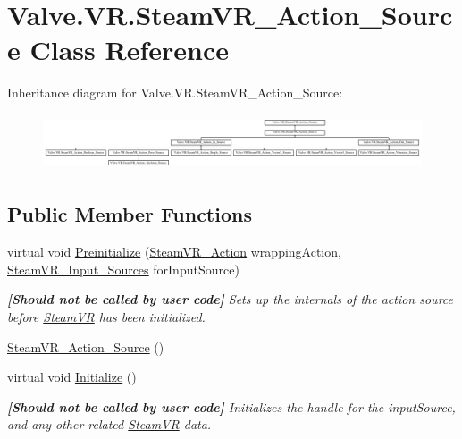 \hypertarget{class_valve_1_1_v_r_1_1_steam_v_r___action___source}{}\section{Valve.\+V\+R.\+Steam\+V\+R\+\_\+\+Action\+\_\+\+Source Class Reference}
\label{class_valve_1_1_v_r_1_1_steam_v_r___action___source}
Inheritance diagram for Valve.\+V\+R.\+Steam\+V\+R\+\_\+\+Action\+\_\+\+Source\+:\begin{figure}[H]
\begin{center}
\leavevmode
\includegraphics[height=1.678657cm]{class_valve_1_1_v_r_1_1_steam_v_r___action___source}
\end{center}
\end{figure}
\subsection*{Public Member Functions}
\begin{DoxyCompactItemize}
\item 
virtual void \mbox{\hyperlink{class_valve_1_1_v_r_1_1_steam_v_r___action___source_aa2bec7f32b37595de01f1456a3fa5bfe}{Preinitialize}} (\mbox{\hyperlink{class_valve_1_1_v_r_1_1_steam_v_r___action}{Steam\+V\+R\+\_\+\+Action}} wrapping\+Action, \mbox{\hyperlink{namespace_valve_1_1_v_r_a82e5bf501cc3aa155444ee3f0662853f}{Steam\+V\+R\+\_\+\+Input\+\_\+\+Sources}} for\+Input\+Source)
\begin{DoxyCompactList}\small\item\em {\bfseries{\mbox{[}Should not be called by user code\mbox{]}}} Sets up the internals of the action source before \mbox{\hyperlink{class_valve_1_1_v_r_1_1_steam_v_r}{Steam\+VR}} has been initialized. \end{DoxyCompactList}\item 
\mbox{\hyperlink{class_valve_1_1_v_r_1_1_steam_v_r___action___source_afe35f80548857d2da588f8a0c036e3e3}{Steam\+V\+R\+\_\+\+Action\+\_\+\+Source}} ()
\item 
virtual void \mbox{\hyperlink{class_valve_1_1_v_r_1_1_steam_v_r___action___source_aa4784c092cc0a4372812834bfcceab6d}{Initialize}} ()
\begin{DoxyCompactList}\small\item\em {\bfseries{\mbox{[}Should not be called by user code\mbox{]}}} Initializes the handle for the input\+Source, and any other related \mbox{\hyperlink{class_valve_1_1_v_r_1_1_steam_v_r}{Steam\+VR}} data. \end{DoxyCompactList}\end{DoxyCompactItemize}
